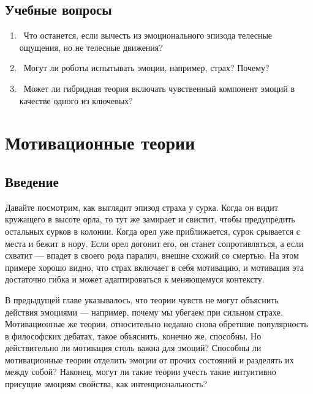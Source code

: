 \documentclass[11pt]{book}
\begin{document}
\begin{tcolorbox}
\section{Учебные вопросы}
\begin{enumerate}
\item\ Что останется, если вычесть из эмоционального эпизода телесные ощущения, но не телесные движения?
\item\ Могут ли роботы испытывать эмоции, например, страх? Почему?
\item\ Может ли гибридная теория включать чувственный компонент эмоций в качестве одного из ключевых?
\end{enumerate}
\end{tcolorbox}

\chapter{Мотивационные теории}

\section{Введение}

Давайте посмотрим, как выглядит эпизод страха у сурка. Когда он видит кружащего в высоте орла, то тут же замирает и свистит, чтобы предупредить остальных сурков в колонии. Когда орел уже приближается, сурок срывается с места и бежит в нору. Если орел догонит его, он станет сопротивляться, а если схватит --- впадет в своего рода паралич, внешне схожий со смертью. На этом примере хорошо видно, что страх включает в себя мотивацию, и мотивация эта достаточно гибка и может адаптироваться к меняющемуся контексту.

В предыдущей главе указывалось, что теории чувств не могут объяснить действия эмоциями --- например, почему мы убегаем при сильном страхе. Мотивационные же теории, относительно недавно снова обретшие популярность в философских дебатах, такое объяснить, конечно же, способны. Но действительно ли мотивация столь важна для эмоций? Способны ли мотивационные теории отделить эмоции от прочих состояний и разделять их между собой? Наконец, могут ли такие теории учесть такие интуитивно присущие эмоциям свойства, как интенциональность?
\end{document}
